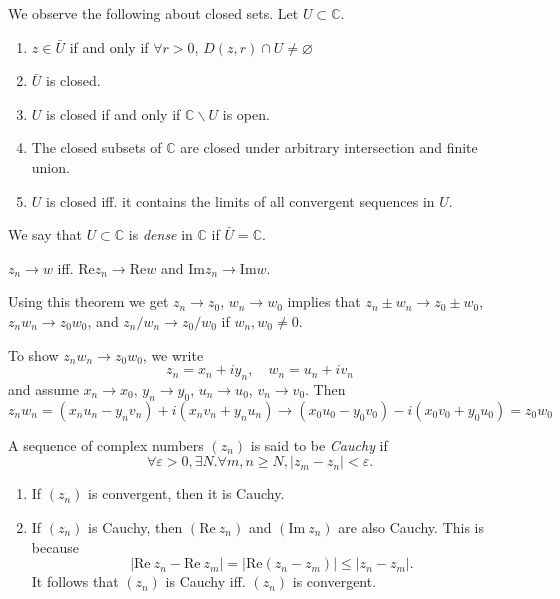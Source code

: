 \begin{obsv}
  We observe the following about closed sets. Let $U \subset \mathbb{C}$.
  \begin{enumerate}
    \item{
      $z \in \bar{U}$ if and only if $\forall r > 0$, 
      $D(z, r) \cap U \neq \varnothing$
    }
    \item{
      $\bar{U}$ is closed.
    }
    \item{
      $U$ is closed if and only if $\mathbb{C} \backslash U$ is open.
    }
    \item{
      The closed subsets of $\mathbb{C}$ are closed under 
      arbitrary intersection and finite union.
    }
    \item{
      $U$ is closed iff. it contains the limits of all convergent sequences
      in $U$.
    }
  \end{enumerate}
\end{obsv}

\begin{defn}
We say that $U \subset \mathbb{C}$ is \emph{dense} in
$\mathbb{C}$ if $\bar{U} = \mathbb{C}$.
\end{defn}

\begin{theorem}
  $z_n \to w$ iff. $\mathrm{Re} z_n \to \mathrm{Re} w$ and
  $\mathrm{Im} z_n \to \mathrm{Im} w$.
\end{theorem}

Using this theorem we get $z_n \to z_0$, $w_n \to w_0$
implies that $z_n \pm w_n \to z_0 \pm w_0$,
$z_n w_n \to z_0 w_0$, and $z_n / w_n \to z_0 / w_0$ if
$w_n, w_0 \neq 0$.

\begin{xmpl}
  To show $z_n w_n \to z_0 w_0$, we write
  $$
  z_n = x_n + i y_n, \quad w_n = u_n + i v_n
  $$
  and assume $x_n \to x_0$, $y_n \to y_0$,
  $u_n \to u_0$, $v_n \to v_0$. Then
  $$
      z_n w_n
  =   (x_n u_n - y_n v_n) + i (x_n v_n + y_n u_n)
  \to (x_0 u_0 - y_0 v_0) - i (x_0 v_0 + y_0 u_0)
  =   z_0 w_0
  $$
\end{xmpl}

\begin{defn}
  A sequence of complex numbers $(z_n)$ is said to be
  \emph{Cauchy} if
  $$
  \forall \varepsilon > 0, \exists N . \forall m, n \geq N,
  |z_m - z_n| < \varepsilon.
  $$
\end{defn}

\begin{obsv}
  \begin{enumerate}
    \item{
      If $(z_n)$ is convergent, then it is Cauchy.
    }
    \item{
      If $(z_n)$ is Cauchy, then $(\mathrm{Re}~z_n)$
      and $(\mathrm{Im}~z_n)$ are also Cauchy. This is because
      $$
           | \mathrm{Re}~z_n - \mathrm{Re}~z_m|
      =    |\mathrm{Re}(z_n - z_m)|
      \leq |z_n - z_m|.
      $$
      It follows that $(z_n)$ is Cauchy iff. $(z_n)$ is convergent.
    }
  \end{enumerate}
\end{obsv}


